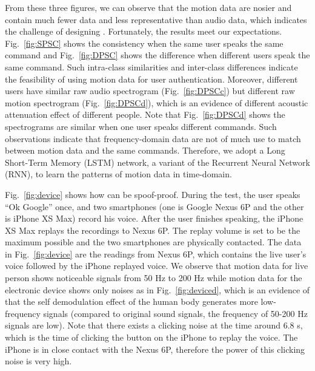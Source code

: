 %
From these three figures, we can observe that the motion data are nosier and contain much fewer data and less representative than audio data, which indicates the challenge of designing {\shortname}. Fortunately, the results meet our expectations. Fig.~\ref{fig:SPSC} shows the consistency when the same user speaks the same command and Fig.~\ref{fig:DPSC} shows the difference when different users speak the same command. Such intra-class similarities and inter-class differences indicate the feasibility of using motion data for user authentication. Moreover, different users have similar raw audio spectrogram (Fig.~\ref{fig:DPSCc}) but different raw motion spectrogram (Fig.~\ref{fig:DPSCd}), which is an evidence of different acoustic attenuation effect of different people. Note that Fig.~\ref{fig:DPSCd} shows the spectrograms are similar when one user speaks different commands. Such observations indicate that frequency-domain data are not of much use to match between motion data and the same commands. Therefore, we adopt a Long Short-Term Memory (LSTM) network, a variant of the Recurrent Neural Network (RNN), to learn the patterns of motion data in time-domain. 


Fig.~\ref{fig:device} shows how {\shortname} can be spoof-proof. During the test, the user speaks ``Ok Google'' once, and two smartphones (one is Google Nexus 6P and the other is iPhone XS Max) record his voice. After the user finishes speaking, the iPhone XS Max replays the recordings to Nexus 6P. The replay volume is set to be the maximum possible and the two smartphones are physically contacted. The data in Fig.~\ref{fig:device} are the readings from Nexus 6P, which contains the live user's voice followed by the iPhone replayed voice. We observe that motion data for live person shows noticeable signals from 50 Hz to 200 Hz while motion data for the electronic device shows only noises as in Fig.~\ref{fig:deviced}, which is an evidence of that the self demodulation effect of the human body generates more low-frequency signals (compared to original sound signals, the frequency of 50-200 Hz signals are low). Note that there exists a clicking noise at the time around 6.8 s, which is the time of clicking the button on the iPhone to replay the voice. The iPhone is in close contact with the Nexus 6P, therefore the power of this clicking noise is very high.
